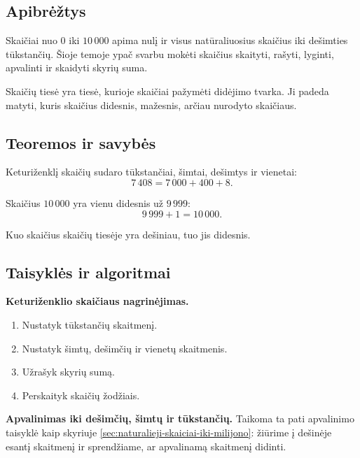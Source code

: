 \subsection{Apibrėžtys}

\begin{apibreztis}
Skaičiai nuo \(0\) iki \(10\,000\) apima nulį ir visus natūraliuosius skaičius iki dešimties tūkstančių. Šioje temoje ypač svarbu mokėti skaičius skaityti, rašyti, lyginti, apvalinti ir skaidyti skyrių suma.
\end{apibreztis}

\begin{apibreztis}
Skaičių tiesė yra tiesė, kurioje skaičiai pažymėti didėjimo tvarka. Ji padeda matyti, kuris skaičius didesnis, mažesnis, arčiau nurodyto skaičiaus.
\end{apibreztis}

\subsection{Teoremos ir savybės}

\begin{savybe}
Keturiženklį skaičių sudaro tūkstančiai, šimtai, dešimtys ir vienetai:
\[
7\,408=7\,000+400+8.
\]
\end{savybe}

\begin{savybe}
Skaičius \(10\,000\) yra vienu didesnis už \(9\,999\):
\[
9\,999+1=10\,000.
\]
\end{savybe}

\begin{savybe}
Kuo skaičius skaičių tiesėje yra dešiniau, tuo jis didesnis.
\end{savybe}

\subsection{Taisyklės ir algoritmai}

\textbf{Keturiženklio skaičiaus nagrinėjimas.}
\begin{enumerate}[label=\arabic*.]
\item Nustatyk tūkstančių skaitmenį.
\item Nustatyk šimtų, dešimčių ir vienetų skaitmenis.
\item Užrašyk skyrių sumą.
\item Perskaityk skaičių žodžiais.
\end{enumerate}

\textbf{Apvalinimas iki dešimčių, šimtų ir tūkstančių.}
Taikoma ta pati apvalinimo taisyklė kaip skyriuje \ref{sec:naturalieji-skaiciai-iki-milijono}: žiūrime į dešinėje esantį skaitmenį ir sprendžiame, ar apvalinamą skaitmenį didinti.


